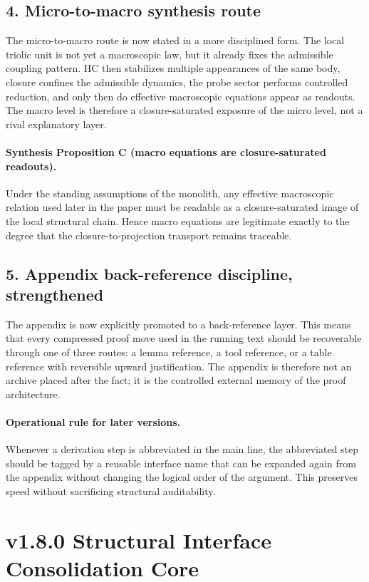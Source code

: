 \subsection*{4. Micro-to-macro synthesis route}
The micro-to-macro route is now stated in a more disciplined form. The local
triolic unit is not yet a macroscopic law, but it already fixes the admissible
coupling pattern. HC then stabilizes multiple appearances of the same body,
closure confines the admissible dynamics, the probe sector performs controlled
reduction, and only then do effective macroscopic equations appear as readouts.
The macro level is therefore a closure-saturated exposure of the micro level,
not a rival explanatory layer.

\paragraph{Synthesis Proposition C (macro equations are closure-saturated readouts).}
Under the standing assumptions of the monolith, any effective macroscopic
relation used later in the paper must be readable as a closure-saturated image
of the local structural chain. Hence macro equations are legitimate exactly to
the degree that the closure-to-projection transport remains traceable.

\subsection*{5. Appendix back-reference discipline, strengthened}
The appendix is now explicitly promoted to a back-reference layer. This means
that every compressed proof move used in the running text should be recoverable
through one of three routes: a lemma reference, a tool reference, or a table
reference with reversible upward justification. The appendix is therefore not an
archive placed after the fact; it is the controlled external memory of the proof
architecture.

\paragraph{Operational rule for later versions.}
Whenever a derivation step is abbreviated in the main line, the abbreviated step
should be tagged by a reusable interface name that can be expanded again from
the appendix without changing the logical order of the argument. This preserves
speed without sacrificing structural auditability.


\section*{v1.8.0 Structural Interface Consolidation Core}

